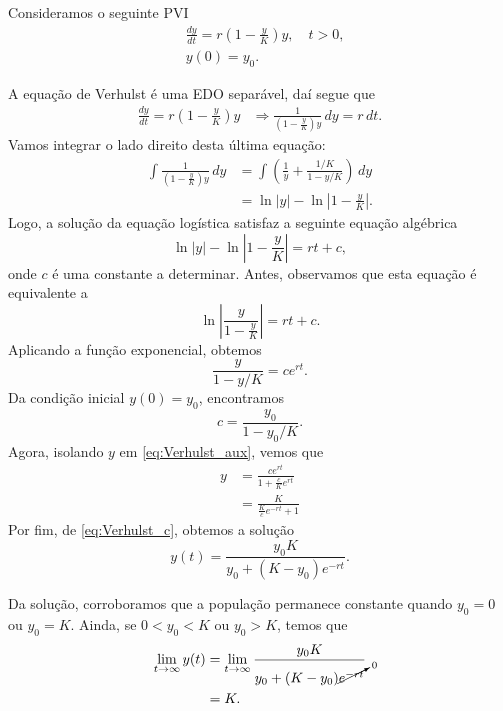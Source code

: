 Consideramos o seguinte PVI
\begin{align}
  &\frac{dy}{dt} = r\left(1 - \frac{y}{K}\right)y,\quad t>0,\\
  &y(0) = y_0.
\end{align}

A equação de Verhulst é uma EDO separável, daí segue que
\begin{align}
  \frac{dy}{dt} = r\left(1 - \frac{y}{K}\right)y &\Rightarrow \frac{1}{\left(1 - \frac{y}{K}\right)y}\,dy = r\,dt.
\end{align}
Vamos integrar o lado direito desta última equação:
\begin{align}
  \int \frac{1}{\left(1 - \frac{y}{K}\right)y}\,dy &= \int \left(\frac{1}{y} + \frac{1/K}{1-y/K}\right)\,dy \\
                                                   &= \ln|y| - \ln\left|1 - \frac{y}{K}\right|.
\end{align}
Logo, a solução da equação logística satisfaz a seguinte equação algébrica
\begin{equation}
  \ln|y| - \ln\left|1 - \frac{y}{K}\right| = rt + c,
\end{equation}
onde $c$ é uma constante a determinar. Antes, observamos que esta equação é equivalente a
\begin{equation}
  \ln\left|\frac{y}{1 - \frac{y}{K}}\right| = rt + c.
\end{equation}
Aplicando a função exponencial, obtemos
\begin{equation}\label{eq:Verhulst_aux}
  \frac{y}{1 - y/K} = ce^{rt}.
\end{equation}
Da condição inicial $y(0) = y_0$, encontramos
\begin{equation}\label{eq:Verhulst_c}
  c = \frac{y_0}{1 - y_0/K}.
\end{equation}
Agora, isolando $y$ em \eqref{eq:Verhulst_aux}, vemos que
\begin{align}
  y &= \frac{ce^{rt}}{1 + \frac{c}{K}e^{rt}} \\
    &= \frac{K}{\frac{K}{c}e^{-rt} + 1}
\end{align}
Por fim, de \eqref{eq:Verhulst_c}, obtemos a solução
\begin{equation}
  y(t) = \frac{y_0K}{y_0 + (K-y_0)e^{-rt}}.
\end{equation}

Da solução, corroboramos que a população permanece constante quando $y_0 = 0$ ou $y_0 = K$. Ainda, se $0<y_0<K$ ou $y_0 > K$, temos que
\begin{align}
  \lim_{t\to\infty} y(t) &= \lim_{t\to\infty} \frac{y_0K}{y_0 + (K-y_0)\cancelto{0}{e^{-rt}}} \\
                         &= K.
\end{align}

